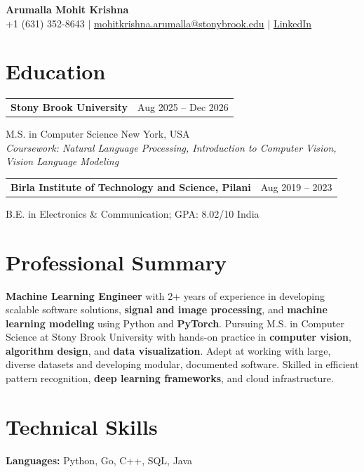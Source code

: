 \documentclass[letterpaper,10pt]{article}
\makeatletter
\newcommand{\entry}[2]{%
  \noindent
  \begin{tabularx}{\linewidth}
    {@{}>{\raggedright\arraybackslash}X@{\hspace{6pt}}r@{}}
    \textbf{#1} & #2
  \end{tabularx}\par
}
\makeatother
\begin{document}
\begin{center}
    {\LARGE\bfseries Arumalla Mohit Krishna}\\[3pt]
    +1 (631) 352-8643 $|$
    \href{mailto:mohitkrishna.arumalla@stonybrook.edu}
    {mohitkrishna.arumalla@stonybrook.edu} $|$
    \href{https://linkedin.com/in/mohit-krishna-arumalla}
    {LinkedIn}
\end{center}
\vspace{-8pt}

\section{Education}

\entry
  {\textbf{Stony Brook University}}
  {Aug 2025 -- Dec 2026}

M.S. in Computer Science \hfill New York, USA\\
\textit{
Coursework: Natural Language Processing,
Introduction to Computer Vision, Vision Language Modeling
}
\vspace{3pt}

\entry
  {\textbf{Birla Institute of Technology and Science, Pilani}}
  {Aug 2019 -- 2023}

B.E. in Electronics \& Communication; GPA: 8.02/10 \hfill India
\section{Professional Summary}

\textbf{Machine Learning Engineer} with 2+ years of experience in developing scalable software solutions, \textbf{signal and image processing}, and \textbf{machine learning modeling} using Python and \textbf{PyTorch}. Pursuing M.S. in Computer Science at Stony Brook University with hands-on practice in \textbf{computer vision}, \textbf{algorithm design}, and \textbf{data visualization}. Adept at working with large, diverse datasets and developing modular, documented software. Skilled in efficient pattern recognition, \textbf{deep learning frameworks}, and cloud infrastructure.

\section{Technical Skills}

\textbf{Languages:}
Python, Go, C++, SQL, Java\\
\end{document}
